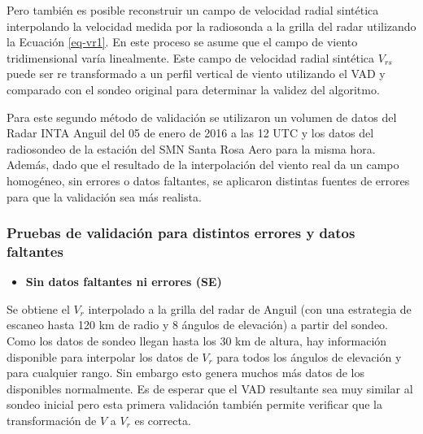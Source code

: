 \documentclass[12pt,spanish,oneside]{book}
\providecommand{\tightlist}{%
  \setlength{\itemsep}{0pt}\setlength{\parskip}{0pt}}
\begin{document}
Pero también es posible reconstruir un campo de velocidad radial
sintética interpolando la velocidad medida por la radiosonda a la grilla
del radar utilizando la Ecuación \ref{eq-vr1}. En este proceso se asume
que el campo de viento tridimensional varía linealmente. Este campo de
velocidad radial sintética \(V_{rs}\) puede ser re transformado a un
perfil vertical de viento utilizando el VAD y comparado con el sondeo
original para determinar la validez del algoritmo.

Para este segundo método de validación se utilizaron un volumen de datos
del Radar INTA Anguil del 05 de enero de 2016 a las 12 UTC y los datos
del radiosondeo de la estación del SMN Santa Rosa Aero para la misma
hora. Además, dado que el resultado de la interpolación del viento real
da un campo homogéneo, sin errores o datos faltantes, se aplicaron
distintas fuentes de errores para que la validación sea más realista.

\subsubsection{Pruebas de validación para distintos errores y datos
faltantes}\label{pruebas-de-validacion-para-distintos-errores-y-datos-faltantes}

\begin{itemize}
\tightlist
\item
  \textbf{Sin datos faltantes ni errores (SE)}
\end{itemize}

Se obtiene el \(V_r\) interpolado a la grilla del radar de Anguil (con
una estrategia de escaneo hasta 120 km de radio y 8 ángulos de
elevación) a partir del sondeo. Como los datos de sondeo llegan hasta
los 30 km de altura, hay información disponible para interpolar los
datos de \(V_r\) para todos los ángulos de elevación y para cualquier
rango. Sin embargo esto genera muchos más datos de los disponibles
normalmente. Es de esperar que el VAD resultante sea muy similar al
sondeo inicial pero esta primera validación también permite verificar
que la transformación de \(V\) a \(V_r\) es correcta.
\end{document}
